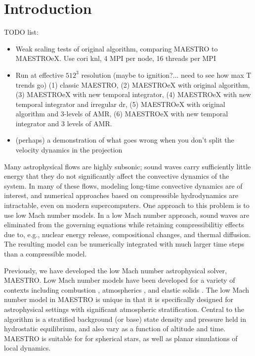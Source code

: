 \section{Introduction} \label{sec:intro}

TODO list:
\begin{itemize}
\item Weak scaling tests of original algorithm, comparing MAESTRO to MAESTROeX.  Use cori knl, 4 MPI per node, 16 threads per MPI
\item Run at effective $512^3$ resolution (maybe to ignition?... need to see how max T trends go) (1) classic MAESTRO, (2) MAESTROeX with original algorithm, (3) MAESTROeX with new temporal integrator, (4) MAESTROeX with new temporal integrator and irregular dr, (5) MAESTROeX with original algorithm and 3-levels of AMR, (6) MAESTROeX with new temporal integrator and 3 levels of AMR.
\item (perhaps) a demonstration of what goes wrong when you don't split the velocity dynamics in the projection
\end{itemize}

Many astrophysical flows are highly subsonic; sound waves carry sufficiently little energy that they do not significantly affect the convective dynamics of the system.
In many of these flows, modeling long-time convective dynamics are of interest, and numerical approaches based on compressible hydrodynamics are intractable, even on modern supercomputers.
One approach to this problem is to use low Mach number models.
In a low Mach number approach, sound waves are eliminated from the governing equations while retaining compressibilitiy effects due to, e.g., nuclear energy release, compositional changes, and thermal diffusion.
The resulting model can be numerically integrated with much larger time steps than a compressible model.

Previously, we have developed the low Mach number astrophysical solver, MAESTRO.
Low Mach number models have been developed for a variety of contexts including combustion \citep{day2000numerical}, atmospherics \citep{duarte2015low}, and elastic solids \citep{abbate2017all}.
The low Mach number model in MAESTRO is unique in that it is specifically designed for astrophysical settings with significant atmospheric stratification.
Central to the algorithm is a stratified background (or base) state density and pressure held in hydrostatic equilibrium, and also vary as a function of altitude and time.
MAESTRO is suitable for for spherical stars, as well as planar simulations of local dynamics.

